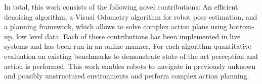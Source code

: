 In total, this work consists of the following novel contributions: An efficient denoising algorithm, a Visual Odometry algorithm for robot pose estimation, and a planning framework, which allows to solve complex action plans using bottom-up, low level data.
Each of these contributions has been implemented in live systems and has been run in an online manner. 
For each algorithm quantitative evaluation on existing benchmarks to demonstrate state-of-the art perception and action is performed.
This work enables robots to navigate in previously unknown and possibly unstructured environments and perform complex action planning.
